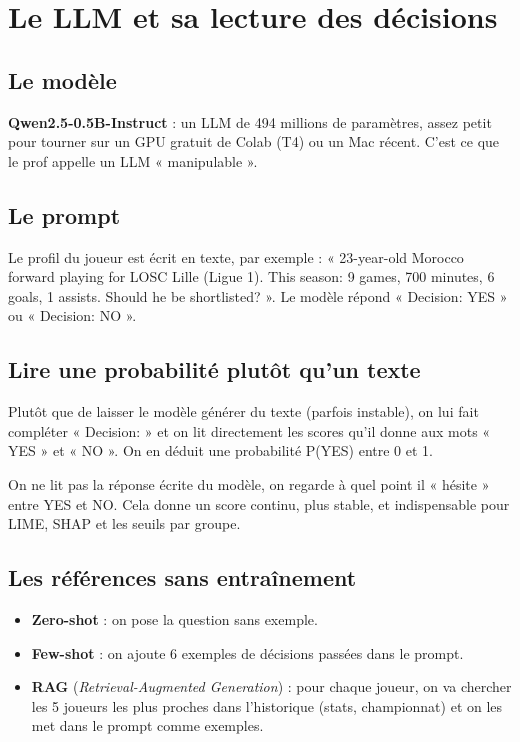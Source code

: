 \documentclass[11pt,a4paper]{article}
\begin{document}
\section{Le LLM et sa lecture des décisions}
\subsection{Le modèle}
\textbf{Qwen2.5-0.5B-Instruct} : un LLM de 494 millions de paramètres, assez petit pour tourner sur un GPU gratuit de Colab (T4) ou un Mac récent. C'est ce que le prof appelle un LLM « manipulable ».

\subsection{Le prompt}
Le profil du joueur est écrit en texte, par exemple : « 23-year-old Morocco forward playing for LOSC Lille (Ligue 1). This season: 9 games, 700 minutes, 6 goals, 1 assists. Should he be shortlisted? ». Le modèle répond « Decision: YES » ou « Decision: NO ».

\subsection{Lire une probabilité plutôt qu'un texte}
Plutôt que de laisser le modèle générer du texte (parfois instable), on lui fait compléter « Decision: » et on lit directement les scores qu'il donne aux mots « YES » et « NO ». On en déduit une probabilité P(YES) entre 0 et 1.

\begin{simple}
On ne lit pas la réponse écrite du modèle, on regarde à quel point il « hésite » entre YES et NO. Cela donne un score continu, plus stable, et indispensable pour LIME, SHAP et les seuils par groupe.
\end{simple}

\subsection{Les références sans entraînement}
\begin{itemize}
  \item \textbf{Zero-shot} : on pose la question sans exemple.
  \item \textbf{Few-shot} : on ajoute 6 exemples de décisions passées dans le prompt.
  \item \textbf{RAG} (\emph{Retrieval-Augmented Generation}) : pour chaque joueur, on va chercher les 5 joueurs les plus proches dans l'historique (stats, championnat) et on les met dans le prompt comme exemples.
\end{itemize}
\end{document}
